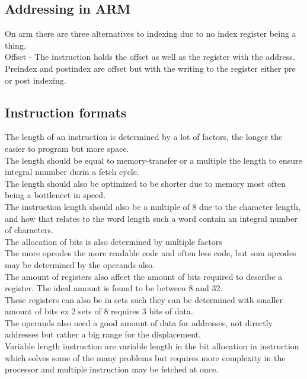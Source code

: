 \documentclass[12pt, a4paper]{article}
\begin{document}
		\subsection{Addressing in ARM}
			On arm there are three alternatives to indexing due to no index register being a thing.\\
			Offset - The instruction holds the offset as well as the register with the address.\\
			Preindex and postindex are offset but with the writing to the register either pre or post indexing.\\
		\subsection{Instruction formats}
			The length of an instruction is determined by a lot of factors, the longer the easier to program but more space.\\
			The length should be equal to memory-transfer or a multiple the length to ensure integral nnumber durin a fetch cycle.\\
			The length should also be optimized to be shorter due to memory most often being a bottlenect in speed. \\
			The instruction length should also be a multiple of 8 due to the character length, and how that relates to the word length such a word contain an integral number of characters.\\[4mm]
			The allocation of bits is also determined by multiple factors\\
			The more opcodes the more readable code and often less code, but som opcodes may be determined by the operands also.\\
			The amount of registers also affect the amount of bits required to describe a register. The ideal amount is found to be between 8 and 32.\\
			These registers can also be in sets such they can be determined with smaller amount of bits ex 2 sets of 8 requires 3 bits of data.\\
			The operands also need a good amount of data for addresses, not directly addresses but rather a big range for the displacement.\\
			Variable length instruction are variable length in the bit allocation in instruction which solves some of the many problems but requires more complexity in the processor and multiple instruction may be fetched at once.\\
\end{document}
